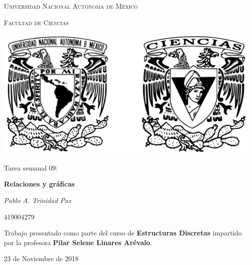 \documentclass[11pt,letterpaper]{article}
\begin{document}
\begin{titlepage}
    \centering

    {\scshape\LARGE Universidad Nacional Autónoma de México \par}

    \vspace{1cm}
    {\scshape\Large Facultad de Ciencias\par}
    \vspace{1.5cm}

    \begin{center}
        \includegraphics[scale=.1]{../../assets/img/logo.png}
    \end{center}

    \vspace{.8 cm}

    {\LARGE Tarea semanal 09: \par}
    {\huge\bfseries Relaciones y gráficas \par}

    \vspace{0.5cm}
    {\large\itshape Pablo A. Trinidad Paz\par}
    419004279

    \vfill

    Trabajo presentado como parte del curso de \textbf{Estructuras Discretas}
    impartido por la profesora \textbf{Pilar Selene Linares Arévalo}. \par
    \vspace{0.1cm}
    {\large 23 de Noviembre de 2018\par}
\end{titlepage}
\end{document}
